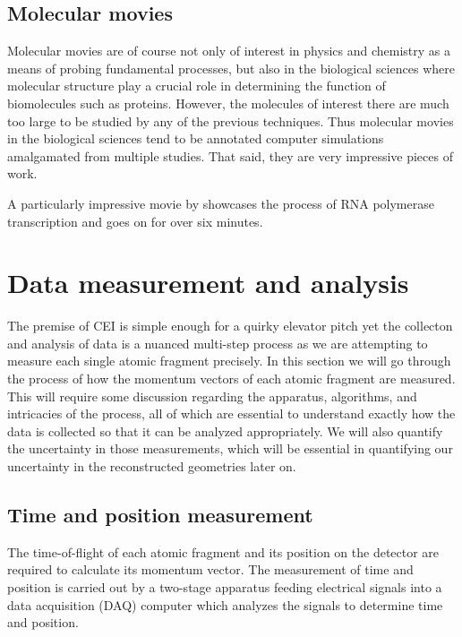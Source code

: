 
\subsection{Molecular movies}
Molecular movies are of course not only of interest in physics and chemistry as a means of probing fundamental processes, but also in the biological sciences where molecular structure play a crucial role in determining the function of biomolecules such as proteins. However, the molecules of interest there are much too large to be studied by any of the previous techniques. Thus molecular movies in the biological sciences tend to be annotated computer simulations amalgamated from multiple studies. That said, they are very impressive pieces of work.

A particularly impressive movie by \citet{Cheung12} showcases the process of RNA polymerase transcription and goes on for over six minutes.

\section{Data measurement and analysis}
The premise of CEI is simple enough for a quirky elevator pitch yet the collecton and analysis of data is a nuanced multi-step process as we are attempting to measure each single atomic fragment precisely. In this section we will go through the process of how the momentum vectors of each atomic fragment are measured. This will require some discussion regarding the apparatus, algorithms, and intricacies of the process, all of which are essential to understand exactly how the data is collected so that it can be analyzed appropriately. We will also quantify the uncertainty in those measurements, which will be essential in quantifying our uncertainty in the reconstructed geometries later on.

\subsection{Time and position measurement}
The time-of-flight of each atomic fragment and its position on the detector are required to calculate its momentum vector. The measurement of time and position is carried out by a two-stage apparatus feeding electrical signals into a data acquisition (DAQ) computer which analyzes the signals to determine time and position.

